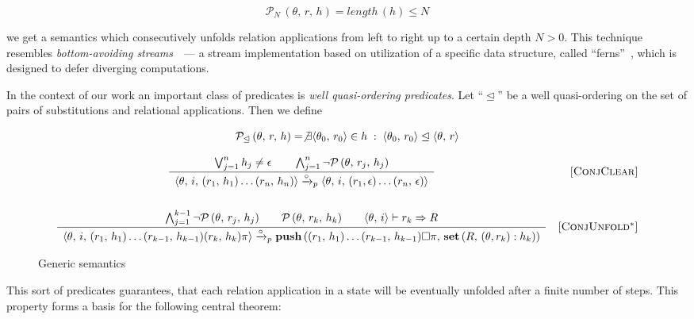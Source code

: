 \[
\mathcal{P}_N\,(\theta,\, r,\, h) = length\,(h) \leq N
\]

we get a semantics which consecutively unfolds relation applications from left to right up to a certain depth $N>0$. This technique resembles \emph{bottom-avoiding
streams}~\cite{fair:WillThesis}~--- a stream implementation based on utilization of a specific data structure, called ``ferns''~\cite{fair:ferns}, which is designed
to defer diverging computations.

In the context of our work an important class of predicates is \emph{well quasi-ordering predicates}. Let ``$\trianglelefteq$'' be a well quasi-ordering on the set of
pairs of substitutions and relational applications. Then we define

\[
\mathcal{P}_\trianglelefteq\,(\theta,\,r,\,h) = \not\exists\langle \theta_0,\,r_0 \rangle\in h\;:\; \langle \theta_0,\,r_0 \rangle\trianglelefteq \langle \theta,\,r \rangle
\]

\begin{figure*}[t]
\[\begin{array}{cr}
      \dfrac
      {
      \bigvee_{j=1}^n h_j \not= \epsilon \qquad
      \bigwedge_{j=1}^n \neg\mathcal{P}\,(\theta,\,r_j,\,h_j)
      }
      {\begin{array}{l}
      \langle \theta,\, i,\, (r_1,\,h_1) \ldots (r_n,\,h_n) \rangle \xrightarrow{\circ}_p \langle \theta,\, i,\, (r_1,\epsilon) \ldots (r_n,\, \epsilon) \rangle
      \end{array}}
      &  \mbox{[\textsc{ConjClear}]} \\[10mm]
      \dfrac
      {
       \bigwedge_{j=1}^{k-1} \neg\mathcal{P}\,(\theta,\, r_j,\, h_j) \qquad
       \mathcal{P}\,(\theta,\, r_k,\, h_k) \qquad
       \langle \theta,\, i \rangle \vdash r_k \Rightarrow R 
      }
      {
        \begin{array}{l}
          \langle \theta,\, i,\, (r_1,\,h_1) \ldots (r_{k-1},\,h_{k-1}) (r_k,\, h_k) \pi \rangle \xrightarrow{\circ}_p \mbox{\bf push}\,((r_1,\,h_1) \ldots (r_{k-1},\,h_{k-1})\Box \pi,\, \mbox{\bf set}\,(R, \, (\theta, r_k) : h_k))
         \end{array}
        }
&     \mbox{[\textsc{ConjUnfold$^*$}]} 
\end{array}\]
\caption{Generic semantics}
\label{fair:pred-fair-semantics}
\end{figure*}

This sort of predicates guarantees, that each relation application in a state will be eventually unfolded after a finite number of steps. This property
forms a basis for the following central theorem:


